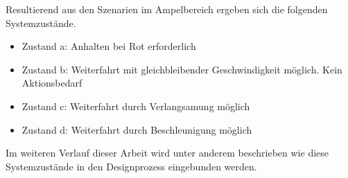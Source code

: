 Resultierend aus den Szenarien im Ampelbereich ergeben sich die folgenden Systemzustände.
\begin{itemize}
	\item Zustand a: Anhalten bei Rot erforderlich
	\item Zustand b: Weiterfahrt mit gleichbleibender Geschwindigkeit möglich. Kein Aktionsbedarf
	\item Zustand c: Weiterfahrt durch Verlangsamung möglich
	\item Zustand d: Weiterfahrt durch Beschleunigung möglich
\end{itemize}
Im weiteren Verlauf dieser Arbeit wird unter anderem beschrieben wie diese Systemzustände in den Designprozess eingebunden werden.
